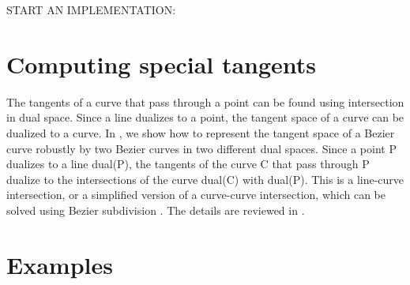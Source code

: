 \documentclass[12pt]{article}
\newif\ifJournal
\begin{document}
START AN IMPLEMENTATION:

\ifJournal
Implementation improvement:
lazily compute concavities, angular ranges, etc. on demand: only a few objects are
probed and then need more information computed.
\fi



\section{Computing special tangents}

The tangents of a curve that pass through a point can be found 
using intersection in dual space.
Since a line dualizes to a point, the tangent space of a curve can be dualized to a curve.
In \cite{jj01}, we show how to represent the tangent space of a Bezier curve robustly by
two Bezier curves in two different dual spaces.
Since a point P dualizes to a line dual(P), the tangents of the curve C that pass
through P dualize to the intersections of the curve dual(C) with dual(P).
This is a line-curve intersection, or a simplified version of a curve-curve intersection,
which can be solved using Bezier subdivision \cite{}.
The details are reviewed in \cite{jj02}.

\section{Examples}
\end{document}
